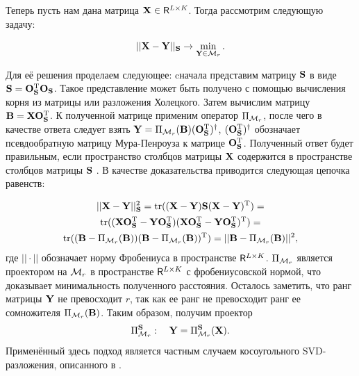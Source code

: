 \documentclass[12pt,a4paper,fleqn,leqno]{article}
\DeclareMathOperator{\tr}{tr}
\begin{document}
Теперь пусть нам дана матрица $\mathbf{X} \in \mathsf{R}^{L \times K}$. Тогда рассмотрим следующую задачу:

\begin{equation*}
||\mathbf{X} - \mathbf{Y}||_{\mathbf{S}} \to \min_{\mathbf{Y} \in \mathcal{M}_r}.
\end{equation*}

Для её решения проделаем следующее: cначала представим матрицу $\mathbf{S}$ в виде $\mathbf{S} = \mathbf{O}_{\mathbf{S}}^{\mathrm{T}}\mathbf{O}_{\mathbf{S}}$. Такое представление может быть получено с помощью вычисления корня из матрицы или разложения Холецкого. Затем вычислим матрицу $\mathbf{B} = \mathbf{X} \mathbf{O}_{\mathbf{S}}^{\mathrm{T}}$. К полученной матрице применим оператор $\Pi_{\mathcal{M}_r}$, после чего в качестве ответа следует взять $\mathbf{Y} = \Pi_{\mathcal{M}_r}(\mathbf{B}) (\mathbf{O}_{\mathbf{S}}^{\mathrm{T}})^\dagger$, $(\mathbf{O}_{\mathbf{S}}^{\mathrm{T}})^\dagger$ обозначает псевдообратную матрицу Мура-Пенроуза к матрице $\mathbf{O}_{\mathbf{S}}^{\mathrm{T}}$. Полученный ответ будет правильным, если пространство столбцов матрицы $\mathbf{X}$ содержится в пространстве столбцов матрицы $\mathbf{S}$ \cite{Golyandina2013}. В качестве доказательства приводится следующая цепочка равенств:

\begin{gather*}
||\bfX - \bfY||^2_{\bfS} = \tr((\bfX - \bfY)\bfS(\bfX - \bfY)^\rmT) =\\ \tr((\bfX \bfO_\bfS^{\rmT} - \bfY\bfO_\bfS^{\rmT})(\bfX \bfO_\bfS^{\rmT} - \bfY\bfO_\bfS^{\rmT})^\rmT) = \\
\tr((\bfB - \Pi_{\calM_r}(\bfB))(\bfB - \Pi_{\calM_r}(\bfB))^\rmT)=||\bfB - \Pi_{\calM_r}(\bfB)||^2,
\end{gather*}
где $||\cdot||$ обозначает норму Фробениуса в пространстве $\mathsf{R}^{L \times K}$. $\Pi_{\mathcal{M}_r}$ является проектором на $\mathcal{M}_r$ в пространстве $\mathsf{R}^{L \times K}$ с фробениусовской нормой, что доказывает минимальность полученного расстояния. Осталось заметить, что ранг матрицы $\mathbf{Y}$ не превосходит $r$, так как ее ранг не превосходит ранг ее сомножителя $\Pi_{\mathcal{M}_r}(\mathbf{B})$. Таким образом, получим проектор
\begin{equation}\label{pi_bfs}
\Pi_{\mathcal{M}_r}^{\mathbf{S}}: \quad \mathbf{Y} = \Pi_{\mathcal{M}_r}^{\mathbf{S}}(\mathbf{X}).
\end{equation}
Применённый здесь подход является частным случаем косоугольного SVD-разложения, описанного в \cite{Golyandina2013}.
\end{document}
